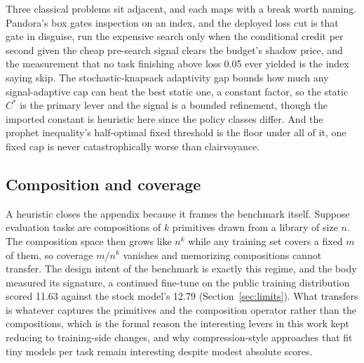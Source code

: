 \documentclass[11pt]{article}
\begin{document}
Three classical problems sit adjacent, and each maps with a break worth naming. Pandora's box gates
inspection on an index, and the deployed loss cut is that gate in disguise, run the expensive search
only when the conditional credit per second given the cheap pre-search signal clears the budget's
shadow price, and the measurement that no task finishing above loss 0.05 ever yielded is the index
saying skip. The stochastic-knapsack adaptivity gap bounds how much any signal-adaptive cap can beat
the best static one, a constant factor, so the static $C^\ast$ is the primary lever and the signal is a
bounded refinement, though the imported constant is heuristic here since the policy classes differ. And
the prophet inequality's half-optimal fixed threshold is the floor under all of it, one fixed cap is
never catastrophically worse than clairvoyance.

\subsection{Composition and coverage}

A heuristic closes the appendix because it frames the benchmark itself. Suppose evaluation tasks are
compositions of $k$ primitives drawn from a library of size $n$. The composition space then grows like $n^k$
while any training set covers a fixed $m$ of them, so coverage $m/n^k$ vanishes and memorizing
compositions cannot transfer. The design intent of the benchmark is exactly this regime, and the body
measured its signature, a continued fine-tune on the public training distribution scored 11.63 against
the stock model's 12.79 (Section~\ref{sec:limits}). What transfers is whatever captures the primitives
and the composition operator rather than the compositions, which is the formal reason the interesting
levers in this work kept reducing to training-side changes, and why compression-style approaches that fit
tiny models per task remain interesting despite modest absolute scores.
\end{document}
